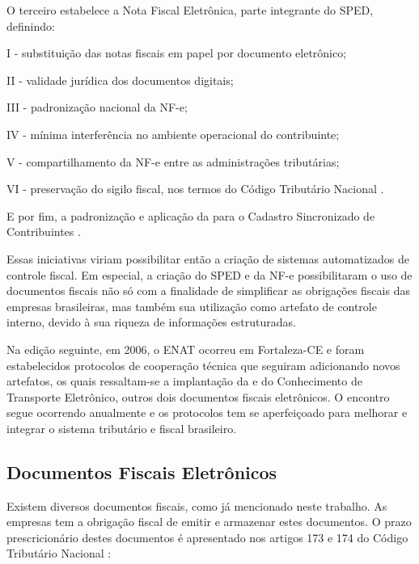 O terceiro estabelece a Nota Fiscal Eletrônica, parte integrante do SPED, definindo:

\begin{citacao}
I - substituição das notas fiscais em papel por documento eletrônico;

II - validade jurídica dos documentos digitais;

III - padronização nacional da NF-e;

IV - mínima interferência no ambiente operacional do contribuinte;

V - compartilhamento da NF-e entre as administrações tributárias;

VI - preservação do sigilo fiscal, nos termos do Código Tributário Nacional \cite{enat:2005:protocolo3}. 
\end{citacao}

E por fim, a padronização e aplicação da  para o Cadastro Sincronizado de Contribuintes \cite{enat:2005:protocolo4}.

Essas iniciativas viriam possibilitar então a criação de sistemas automatizados de controle fiscal. Em especial, a criação do SPED e da NF-e possibilitaram o uso de documentos fiscais não só com a finalidade de simplificar as obrigações fiscais das empresas brasileiras, mas também sua utilização como artefato de controle interno, devido à sua riqueza de informações estruturadas.

Na edição seguinte, em 2006, o ENAT ocorreu em Fortaleza-CE e foram estabelecidos protocolos de cooperação técnica que seguiram adicionando novos artefatos, os quais ressaltam-se a implantação da  e do Conhecimento de Transporte Eletrônico, outros dois documentos fiscais eletrônicos. O encontro segue ocorrendo anualmente e os protocolos tem se aperfeiçoado para melhorar e integrar o sistema tributário e fiscal brasileiro.

\subsection{Documentos Fiscais Eletrônicos}
\label{section:documentos-fiscais:dfe}

Existem diversos documentos fiscais, como já mencionado neste trabalho. As empresas tem a obrigação fiscal de emitir e armazenar estes documentos. O prazo prescricionário destes documentos é apresentado nos artigos 173 e 174 do Código Tributário Nacional \cite{lei:5172:codigo-tributario}:

